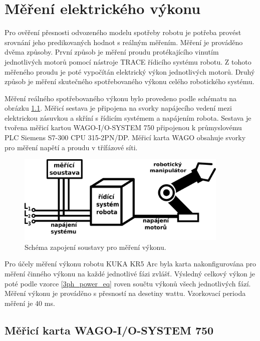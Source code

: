 \chapter{Měření elektrického výkonu}
\label{mereni_el_vykonu_sec}
Pro ověření přesnosti odvozeného modelu spotřeby robotu je potřeba provést srovnání jeho predikovaných hodnot s reálným měřením. Měření je prováděno dvěma způsoby. První způsob je měření proudu protékajícího vinutím jednotlivých motorů pomocí nástroje TRACE řídicího systému robotu. Z tohoto měřeného proudu je poté vypočítán elektrický výkon jednotlivých motorů. Druhý způsob je měření skutečného spotřebovaného výkonu celého robotického systému.    

Měření reálného spotřebovaného výkonu bylo provedeno podle schématu na obrázku \ref{schema_mereni_vykonu_pic}. Měřicí sestava je připojena na svorky napájecího vedení mezi elektrickou zásuvkou a skříní s řídicím systémem a napájením robota. Sestava je tvořena měřicí kartou WAGO-I/O-SYSTEM 750 připojenou k průmyslovému PLC Siemens S7-300 CPU 315-2PN/DP. Měřicí karta WAGO obsahuje svorky pro měření napětí a proudu v třífázové síti. 

\begin{figure}[ht]
\includegraphics[width=0.9\textwidth]{mereni_vykonu_obr}
\caption{Schéma zapojení soustavy pro měření výkonu.}
\label{schema_mereni_vykonu_pic}
\end{figure}

Pro účely měření výkonu robotu KUKA KR5 Arc byla karta nakonfigurována pro měření činného výkonu na každé jednotlivé fázi zvlášť. Výsledný celkový výkon je poté podle vzorce \eqref{3ph_power_eq} roven součtu výkonů všech jednotlivých fází. Měření výkonu je prováděno s přesností na desetiny wattu. Vzorkovací perioda měření je 40 ms. 

\section{Měřicí karta WAGO-I/O-SYSTEM 750}

